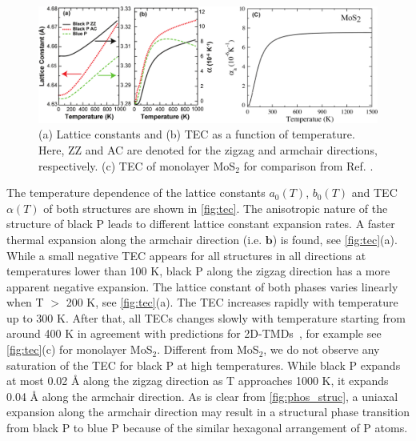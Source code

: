 \begin{figure}[htbp]
\centering
\includegraphics[width=\linewidth]{expan_T.eps}%
\caption{(a) Lattice constants and (b) TEC as a function of temperature.  Here, ZZ and AC are denoted for the zigzag and armchair directions, respectively. (c) TEC of monolayer MoS$_2$ for comparison from Ref. \cite{QHA3}.\label{fig:tec}}
\end{figure}

The temperature dependence of the lattice constants $a_0(T)$, $b_0(T)$ and TEC $\alpha(T)$ of both structures are shown in \autoref{fig:tec}. The anisotropic nature of the structure of black P leads to different lattice constant expansion rates. A faster thermal expansion along the armchair direction (i.e. $\mathbf{b}$) is found, see \autoref{fig:tec}(a). While a small negative TEC appears for all structures in all directions at temperatures lower than 100 K, black P along the zigzag direction has a more apparent negative expansion.  The lattice constant of both phases varies linearly when T $>$ 200 K, see \autoref{fig:tec}(a). The TEC increases rapidly with temperature  up to 300 K.  After that, all TECs changes slowly with temperature starting from around 400 K in agreement with predictions for 2D-TMDs~\cite{QHA2,QHA3}, for example see \autoref{fig:tec}(c) for monolayer MoS$_2$.
Different from MoS$_2$, we do not observe any saturation of the TEC for black P at high temperatures.  While black P expands at most 0.02 {\AA} along the zigzag direction as T approaches 1000 K, it expands 0.04 {\AA} along the armchair direction. As is clear from \autoref{fig:phos_struc}, a uniaxal expansion along the armchair direction may result in a structural phase transition from black P to blue P because of the similar hexagonal arrangement of P atoms\cite{negative-pos}. 

